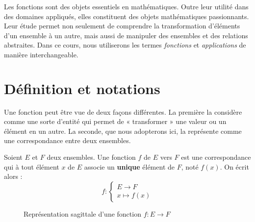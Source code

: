 
\minitoc

Les fonctions sont des objets essentiels en mathématiques. Outre leur utilité dans des domaines appliqués, elles constituent des objets mathématiques passionnants. Leur étude permet non seulement de comprendre la transformation d’éléments d’un ensemble à un autre, mais aussi de manipuler des ensembles et des relations abstraites. Dans ce cours, nous utiliserons les termes \emph{fonctions} et \emph{applications} de manière interchangeable.


\section{Définition et notations}

Une fonction peut être vue de deux façons différentes. La première la considère comme une sorte d’entité qui permet de « transformer » une valeur ou un élément en un autre. La seconde, que nous adopterons ici, la représente comme une correspondance entre deux ensembles.

\begin{definition}[Application]
    Soient $E$ et $F$ deux ensembles. Une fonction $f$ de $E$ vers $F$ est une correspondance qui à tout élément $x$ de $E$ associe un \textbf{unique} élément de $F$, noté $f(x)$. On écrit alors : 
    \[
        f : 
        \begin{cases}
            E \longrightarrow F \\ 
            x \longmapsto f(x)
        \end{cases}
    \]
\end{definition}

\begin{figure}[h!]
    \centering
    \caption{Représentation sagittale d'une fonction $f : E \to F$}
\end{figure}

